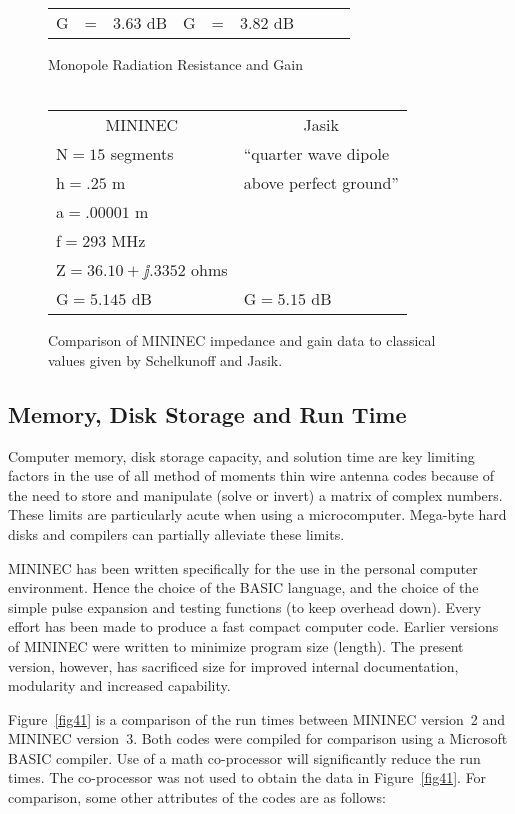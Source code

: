 \documentclass[12pt]{article}
\begin{document}
\begin{figure}[h]
\begin{tabular}{lcllcllcl}
G & = & 3.63 dB   & G & = & 3.82 dB   \\
\end{tabular}
\begin{center}
Monopole Radiation Resistance and Gain\\\ \\
\begin{tabular}{ll}
\multicolumn{1}{c}{MININEC} & \multicolumn{1}{c}{Jasik} \\
N${}=15$ segments            & ``quarter wave dipole    \\
h${}=.25$ m                  & above perfect ground''   \\
a${}=.00001$ m               &                          \\
f${}=293$ MHz                &                          \\
Z${}=36.10+\jj.3352$ ohms    &                          \\
G${}=5.145$ dB               & G${}=5.15$ dB            \\
\end{tabular}
\end{center}
\caption{Comparison of MININEC impedance and gain data to classical
values given by Schelkunoff and Jasik.}
\end{figure}

\subsection{Memory, Disk Storage and Run Time}
Computer memory, disk storage capacity, and solution time are key
limiting factors in the use of all method of moments thin wire antenna
codes because of the need to store and manipulate (solve or invert) a
matrix of complex numbers. These limits are particularly acute when
using a microcomputer. Mega-byte hard disks and compilers can partially
alleviate these limits.

MININEC has been written specifically for the use in the personal
computer environment. Hence the choice of the BASIC language, and the
choice of the simple pulse expansion and testing functions (to keep
overhead down). Every effort has been made to produce a fast compact
computer code. Earlier versions of MININEC were written to minimize
program size (length). The present version, however, has sacrificed size
for improved internal documentation, modularity and increased
capability.

Figure~\ref{fig41} is a comparison of the run times between MININEC
version~2 and MININEC version~3. Both codes were compiled for comparison
using a Microsoft BASIC compiler. Use of a math co-processor will
significantly reduce the run times. The co-processor was not used to
obtain the data in Figure~\ref{fig41}. For comparison, some other
attributes of the codes are as follows:\\
\end{document}
